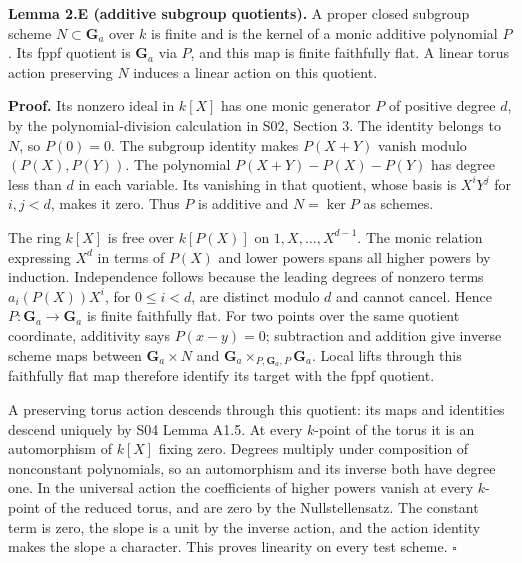 \documentclass[11pt,a4paper,openany]{report}
\begin{document}
\textbf{Lemma 2.E (additive subgroup quotients).} A proper closed subgroup scheme \(N\subset\mathbf G_a\) over \(k\) is finite and is the kernel of a monic additive polynomial \(P\). Its fppf quotient is \(\mathbf G_a\) via \(P\), and this map is finite faithfully flat. A linear torus action preserving \(N\) induces a linear action on this quotient.

\textbf{Proof.} Its nonzero ideal in \(k[X]\) has one monic generator \(P\) of positive degree \(d\), by the polynomial-division calculation in S02, Section 3. The identity belongs to \(N\), so \(P(0)=0\). The subgroup identity makes \(P(X+Y)\) vanish modulo \((P(X),P(Y))\). The polynomial \(P(X+Y)-P(X)-P(Y)\) has degree less than \(d\) in each variable. Its vanishing in that quotient, whose basis is \(X^iY^j\) for \(i,j<d\), makes it zero. Thus \(P\) is additive and \(N=\ker P\) as schemes.

The ring \(k[X]\) is free over \(k[P(X)]\) on \(1,X,\ldots,X^{d-1}\). The monic relation expressing \(X^d\) in terms of \(P(X)\) and lower powers spans all higher powers by induction. Independence follows because the leading degrees of nonzero terms \(a_i(P(X))X^i\), for \(0\leq i<d\), are distinct modulo \(d\) and cannot cancel. Hence \(P:\mathbf G_a\to\mathbf G_a\) is finite faithfully flat. For two points over the same quotient coordinate, additivity says \(P(x-y)=0\); subtraction and addition give inverse scheme maps between \(\mathbf G_a\times N\) and \(\mathbf G_a\times_{P,\mathbf G_a,P}\mathbf G_a\). Local lifts through this faithfully flat map therefore identify its target with the fppf quotient.

A preserving torus action descends through this quotient: its maps and identities descend uniquely by S04 Lemma A1.5. At every \(k\)-point of the torus it is an automorphism of \(k[X]\) fixing zero. Degrees multiply under composition of nonconstant polynomials, so an automorphism and its inverse both have degree one. In the universal action the coefficients of higher powers vanish at every \(k\)-point of the reduced torus, and are zero by the Nullstellensatz. The constant term is zero, the slope is a unit by the inverse action, and the action identity makes the slope a character. This proves linearity on every test scheme. \(\square\)
\end{document}
